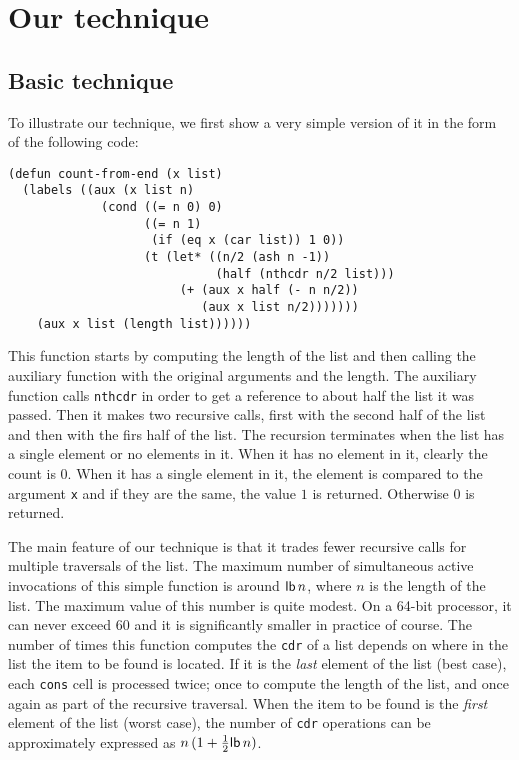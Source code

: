 \section{Our technique}

\subsection{Basic technique}
\label{sec-basic-technique}

To illustrate our technique, we first show a very simple version of it
in the form of the following code:

{\small\begin{verbatim}
(defun count-from-end (x list)
  (labels ((aux (x list n)
             (cond ((= n 0) 0)
                   ((= n 1)
                    (if (eq x (car list)) 1 0))
                   (t (let* ((n/2 (ash n -1))
                             (half (nthcdr n/2 list)))
                        (+ (aux x half (- n n/2))
                           (aux x list n/2)))))))
    (aux x list (length list))))))
\end{verbatim}}

This function starts by computing the length of the list and then
calling the auxiliary function with the original arguments and the
length.  The auxiliary function calls \texttt{nthcdr} in order to get
a reference to about half the list it was passed.  Then it makes two
recursive calls, first with the second half of the list and then with
the firs half of the list.  The recursion terminates when the list has
a single element or no elements in it.  When it has no element in it,
clearly the count is $0$.  When it has a single element in it, the
element is compared to the argument \texttt{x} and if they are the
same, the value $1$ is returned.  Otherwise $0$ is returned.

The main feature of our technique is that it trades fewer recursive
calls for multiple traversals of the list.  The maximum number of
simultaneous active invocations of this simple function is around
$\mathsf{lb}\thinspace n$, where $n$ is the length of the list.  The
maximum value of this number is quite modest.  On a 64-bit processor,
it can never exceed $60$ and it is significantly smaller in practice
of course.  The number of times this function computes the
\texttt{cdr} of a list depends on where in the list the item to be
found is located.  If it is the \emph{last} element of the list (best
case), each \texttt{cons} cell is processed twice; once to compute the
length of the list, and once again as part of the recursive traversal.
When the item to be found is the \emph{first} element of the list
(worst case), the number of \texttt{cdr} operations can be
approximately expressed as $n\thinspace (1 +
\frac{1}{2}\mathsf{lb}\thinspace n)$.

